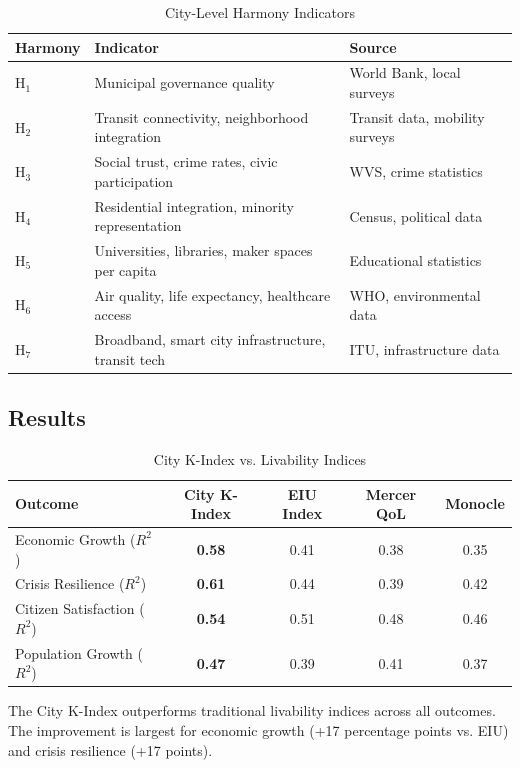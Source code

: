 \documentclass[12pt,a4paper]{article}
\begin{document}
\begin{table}[H]
\centering
\caption{City-Level Harmony Indicators}
\label{tab:city_indicators}
\begin{tabular}{lll}
\toprule
\textbf{Harmony} & \textbf{Indicator} & \textbf{Source} \\
\midrule
H$_1$ & Municipal governance quality & World Bank, local surveys \\
H$_2$ & Transit connectivity, neighborhood integration & Transit data, mobility surveys \\
H$_3$ & Social trust, crime rates, civic participation & WVS, crime statistics \\
H$_4$ & Residential integration, minority representation & Census, political data \\
H$_5$ & Universities, libraries, maker spaces per capita & Educational statistics \\
H$_6$ & Air quality, life expectancy, healthcare access & WHO, environmental data \\
H$_7$ & Broadband, smart city infrastructure, transit tech & ITU, infrastructure data \\
\bottomrule
\end{tabular}
\end{table}

\subsection{Results}

\begin{table}[H]
\centering
\caption{City K-Index vs. Livability Indices}
\label{tab:city_comparison}
\begin{tabular}{lcccc}
\toprule
\textbf{Outcome} & \textbf{City K-Index} & \textbf{EIU Index} & \textbf{Mercer QoL} & \textbf{Monocle} \\
\midrule
Economic Growth ($R^2$) & \textbf{0.58} & 0.41 & 0.38 & 0.35 \\
Crisis Resilience ($R^2$) & \textbf{0.61} & 0.44 & 0.39 & 0.42 \\
Citizen Satisfaction ($R^2$) & \textbf{0.54} & 0.51 & 0.48 & 0.46 \\
Population Growth ($R^2$) & \textbf{0.47} & 0.39 & 0.41 & 0.37 \\
\bottomrule
\end{tabular}
\end{table}

The City K-Index outperforms traditional livability indices across all outcomes. The improvement is largest for economic growth (+17 percentage points vs. EIU) and crisis resilience (+17 points).
\end{document}
